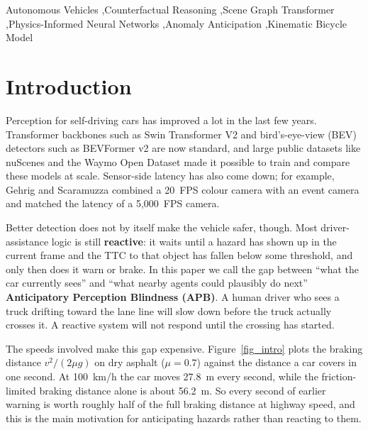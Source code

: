 \documentclass[preprint,12pt]{elsarticle}
\begin{document}
\begin{frontmatter}
\begin{keyword}
Autonomous Vehicles \sep Counterfactual Reasoning \sep Scene Graph Transformer \sep Physics-Informed Neural Networks \sep Anomaly Anticipation \sep Kinematic Bicycle Model
\end{keyword}

\end{frontmatter}

\linenumbers

\section{Introduction}
Perception for self-driving cars has improved a lot in the last few years. Transformer backbones such as Swin Transformer V2 \cite{liu2022swin} and bird's-eye-view (BEV) detectors such as BEVFormer v2 \cite{yang2023bevformer} are now standard, and large public datasets like nuScenes \cite{caesar2020nuscenes} and the Waymo Open Dataset \cite{sun2020waymo} made it possible to train and compare these models at scale. Sensor-side latency has also come down; for example, Gehrig and Scaramuzza \cite{gehrig2024low} combined a 20~FPS colour camera with an event camera and matched the latency of a 5,000~FPS camera.

Better detection does not by itself make the vehicle safer, though. Most driver-assistance logic is still \textbf{reactive}: it waits until a hazard has shown up in the current frame and the TTC to that object has fallen below some threshold, and only then does it warn or brake. In this paper we call the gap between ``what the car currently sees'' and ``what nearby agents could plausibly do next'' \textbf{Anticipatory Perception Blindness (APB)}. A human driver who sees a truck drifting toward the lane line will slow down before the truck actually crosses it. A reactive system will not respond until the crossing has started.

The speeds involved make this gap expensive. Figure~\ref{fig_intro} plots the braking distance $v^2/(2\mu g)$ on dry asphalt ($\mu = 0.7$) against the distance a car covers in one second. At 100~km/h the car moves 27.8~m every second, while the friction-limited braking distance alone is about 56.2~m. So every second of earlier warning is worth roughly half of the full braking distance at highway speed, and this is the main motivation for anticipating hazards rather than reacting to them.
\end{document}
